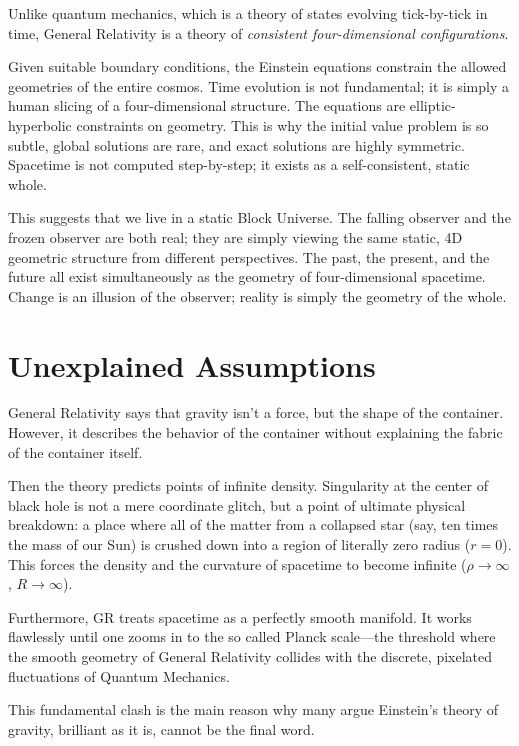 Unlike quantum mechanics, which is a theory of states evolving tick-by-tick in time, General Relativity is a theory of \emph{consistent four-dimensional configurations}.

Given suitable boundary conditions, the Einstein equations constrain the allowed geometries of the entire cosmos.
Time evolution is not fundamental; it is simply a human slicing of a four-dimensional structure.
The equations are elliptic-hyperbolic constraints on geometry.
This is why the initial value problem is so subtle, global solutions are rare, and exact solutions are highly symmetric.
Spacetime is not computed step-by-step; it exists as a self-consistent, static whole.

This suggests that we live in a static Block Universe.
The falling observer and the frozen observer are both real; they are simply viewing the same static, 4D geometric structure from different perspectives.
The past, the present, and the future all exist simultaneously as the geometry of four-dimensional spacetime.
Change is an illusion of the observer; reality is simply the geometry of the whole.



\section{Unexplained Assumptions}

General Relativity says that gravity isn't a force, but the shape of the container.
However, it describes the behavior of the container without explaining the fabric of the container itself. 

Then the theory predicts points of infinite density. Singularity at the center of black hole is not a mere coordinate glitch, but a point of ultimate physical breakdown:
a place where all of the matter from a collapsed star (say, ten times the mass of our Sun) is crushed down into a region of literally zero radius ($r = 0$).
This forces the density and the curvature of spacetime to become infinite ($\rho \rightarrow \infty$, $R \rightarrow \infty$).

Furthermore, GR treats spacetime as a perfectly smooth manifold.
It works flawlessly until one zooms in to the so called Planck scale---the threshold where the smooth geometry of General Relativity collides with the discrete,
pixelated fluctuations of Quantum Mechanics. 

This fundamental clash is the main reason why many argue Einstein's theory of gravity, brilliant as it is, cannot be the final word.

